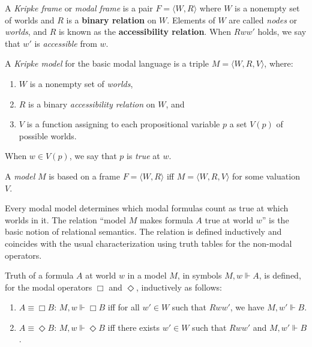   \begin{definition}
    \label{def:kripke-frame}
    \leanok
A \emph{Kripke frame} or \emph{modal frame} is a pair $F = \langle W, R \rangle$ where $W$ is a nonempty set of worlds and $R$ is a \textbf{binary relation} on $W$. 
Elements of $W$ are called \emph{nodes} or \emph{worlds}, and $R$ is known as the \textbf{accessibility relation}. 
When $Rww'$ holds, we say that $w'$ is \emph{accessible} from $w$.
\end{definition}
 



  \begin{definition}
    \label{def:kripke-model}
    \leanok
    A \emph{Kripke model} for the basic modal language is a triple $M = \langle W, R, V \rangle$, where:
    \begin{enumerate}
      \item $W$ is a nonempty set of \emph{worlds},
      \item $R$ is a binary \emph{accessibility relation} on $W$, and
      \item $V$ is a function assigning to each propositional variable $p$ a set $V(p)$ of possible worlds.
    \end{enumerate}
    When $w \in V(p)$, we say that $p$ is \emph{true} at $w$.

    A \emph{model} $M$ is based on a frame $F = \langle W, R \rangle$ iff $M = \langle W, R, V \rangle$ for some valuation $V$.
 \end{definition}
    
Every modal model determines which modal formulas count as true at which worlds in it. The relation ``model $M$ makes formula $A$ true 
at world $w$'' is the basic notion of relational semantics. The relation is defined inductively and coincides with the usual characterization 
using truth tables for the non-modal operators.

\begin{definition}
  \label{truth-of-formula}
  \leanok
  Truth of a formula $A$ at world $w$ in a model $M$, in symbols $M, w \Vdash A$, is defined, 
  for the modal operators $\Box$ and $\Diamond$, inductively as follows:

\begin{enumerate}
  \item $A \equiv \Box B$: $M, w \Vdash \Box B$ iff for all $w' \in W$ 
        such that $Rww'$, we have $M, w' \Vdash B$.
  \item $A \equiv \Diamond B$: $M, w \Vdash \Diamond B$ iff there exists 
        $w' \in W$ such that $Rww'$ and $M, w' \Vdash B$.
\end{enumerate}
\end{definition}

